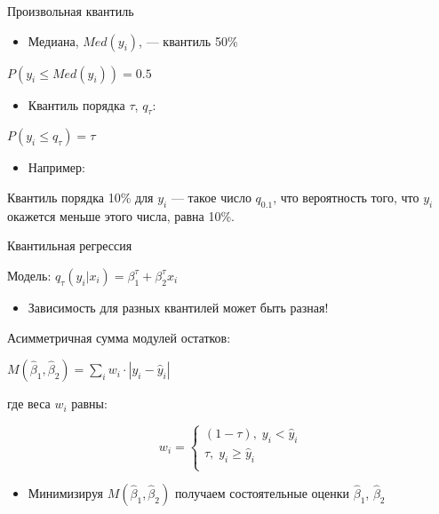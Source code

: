 \documentclass[ignorenonframetext,]{beamer}
\newcommand{\hy}{\hat{y}}
\newcommand{\hb}{\hat{\beta}}
\begin{document}
\begin{frame}{Произвольная квантиль}

\begin{itemize}
\itemsep1pt\parskip0pt
\item
  Медиана, \(Med(y_i)\), --- квантиль 50\%
\end{itemize}

\(P(y_i \leq Med(y_i))=0.5\)

\begin{itemize}
\itemsep1pt\parskip0pt
\item
  Квантиль порядка \(\tau\), \(q_{\tau}\):
\end{itemize}

\(P(y_i \leq q_{\tau})=\tau\)

\begin{itemize}
\itemsep1pt\parskip0pt
\item
  Например:
\end{itemize}

Квантиль порядка 10\% для \(y_i\) --- такое число \(q_{0.1}\), что
вероятность того, что \(y_i\) окажется меньше этого числа, равна 10\%.

\end{frame}

\begin{frame}{Квантильная регрессия}

Модель: \(q_{\tau}(y_i|x_i)=\beta_1^{\tau} + \beta_2^{\tau} x_i\)

\begin{itemize}
\itemsep1pt\parskip0pt
\item
  Зависимость для разных квантилей может быть разная!
\end{itemize}

\end{frame}

\begin{frame}{Асимметричная сумма модулей остатков:}

\(M(\hb_1,\hb_2)=\sum_i w_i \cdot |y_i - \hy_i|\)

где веса \(w_i\) равны:

\[
w_i=\begin{cases}
(1-\tau), \; y_i < \hy_i \\
\tau, \; y_i \geq \hy_i \\
\end{cases}
\]

\begin{itemize}
\itemsep1pt\parskip0pt
\item
  Минимизируя \(M(\hb_1,\hb_2)\) получаем состоятельные оценки
  \(\hb_1\), \(\hb_2\)
\end{itemize}

\end{frame}
\end{document}
